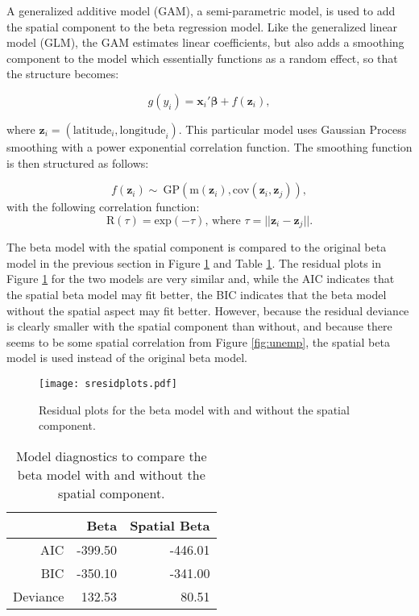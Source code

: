 \documentclass[letterpaper,11pt]{article}
\begin{document}
A generalized additive model (GAM), a semi-parametric model, is used to add the spatial component to the beta regression model. Like the generalized linear model (GLM), the GAM estimates linear coefficients, but also adds a smoothing component to the model which essentially functions as a random effect, so that the structure becomes:

\begin{equation}
g(y_i)=\mathbf{x}_i'\boldsymbol{\beta}+f(\mathbf{z}_i),
\end{equation}

where $\mathbf{z}_i=(\text{latitude}_i,\text{longitude}_i)$. This particular model uses Gaussian Process smoothing with a power exponential correlation function. The smoothing function is then structured as follows:

\begin{equation}
f(\mathbf{z}_i) \sim\ \text{GP}(\text{m}(\mathbf{z}_i),\text{cov}(\mathbf{z}_i,\mathbf{z}_j)),
\end{equation}
with the following correlation function:
\begin{equation}
\text{R}(\tau)=\text{exp}(-\tau) \text{, where }\tau=||\mathbf{z}_i-\mathbf{z}_j||.
\end{equation}

The beta model with the spatial component is compared to the original beta model in the previous section in Figure \ref{fig:sresidplots} and Table \ref{tab:smodcomp}. The residual plots in Figure \ref{fig:sresidplots} for the two models are very similar and, while the AIC indicates that the spatial beta model may fit better, the BIC indicates that the beta model without the spatial aspect may fit better. However, because the residual deviance is clearly smaller with the spatial component than without, and because there seems to be some spatial correlation from Figure \ref{fig:unemp}, the spatial beta model is used instead of the original beta model.

\begin{figure}
\centering
\texttt{[image: sresidplots.pdf]}
\caption{Residual plots for the beta model with and without the spatial component.}
\label{fig:sresidplots}
\end{figure}

\begin{table}[ht]
\small
\centering
\begin{tabular}{rrr}
  \hline
 & Beta & Spatial Beta \\ 
  \hline
AIC & -399.50 & -446.01 \\ 
  BIC & -350.10 & -341.00 \\ 
  Deviance & 132.53 & 80.51 \\  
   \hline
\end{tabular}
   \caption{Model diagnostics to compare the beta model with and without the spatial component.}
   \label{tab:smodcomp}
\end{table}
\end{document}
